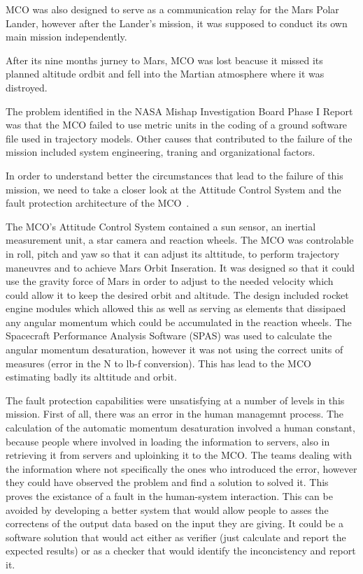 MCO was also designed to serve as a communication relay for the Mars Polar
Lander, however after the Lander's mission, it was supposed to conduct its own
main mission independently.

After its nine months jurney to Mars, MCO was lost beacuse it missed its planned
altitude ordbit and fell into the Martian atmosphere where it was distroyed.

The problem identified in the NASA Mishap Investigation Board Phase I
Report~\cite{mco-rep} was that the MCO failed to use metric units in the coding
of a ground software file used in trajectory models. Other causes that
contributed to the failure of the mission included system engineering, traning
and organizational factors.

In order to understand better the circumstances that lead to the failure of this
mission, we need to take a closer look at the Attitude Control System and
the fault protection architecture of the MCO~\cite{surv-nasa-mars}.

The MCO's Attitude Control System contained a sun sensor, an inertial
measurement unit, a star camera and reaction wheels. The MCO was controlable in
roll, pitch and yaw so that it can adjust its alttitude, to perform trajectory
maneuvres and to achieve Mars Orbit Inseration. It was designed so that it could
use the gravity force of Mars in order to adjust to the needed velocity which
could allow it to keep the desired orbit and altitude. The design included
rocket engine modules which allowed this as well as serving as elements that
dissipaed any angular momentum which could be accumulated in the reaction
wheels. The Spacecraft Performance Analysis Software (SPAS) was used to
calculate the angular momentum desaturation, however it was not using the
correct units of measures (error in the N to lb-f conversion). This has lead to
the MCO estimating badly its alttitude and orbit.

The fault protection capabilities were unsatisfying at a number of levels in
this mission. First of all, there was an error in the human managemnt process.
The calculation of the automatic momentum desaturation involved a human
constant, because people where involved in loading the information to servers,
also in retrieving it from servers and uploinking it to the MCO. The teams
dealing with the information where not specifically the ones who introduced the
error, however they could have observed the problem and find a solution to
solved it. This proves the existance of a fault in the human-system interaction.
This can be avoided by developing a better system that would allow people to
asses the correctens of the output data based on the input they are giving. It
could be a software solution that would act either as verifier (just calculate
and report the expected results) or as a checker that would identify the
inconcistency and report it.

